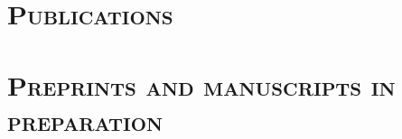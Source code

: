 \documentclass[centered,overlapped,line]{res}
\begin{document}
\begin{resume}




  \section{\bf \large \scshape  Publications}

  { \setlength{\parskip}{1.25ex}

    
  }

  \section{\bf \large \scshape  Preprints and manuscripts in preparation}


\end{resume}
\end{document}
